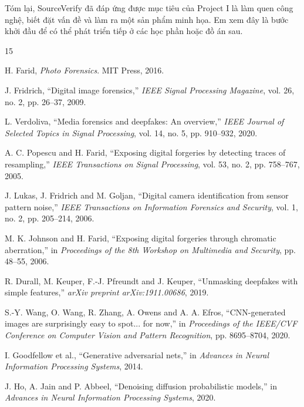\documentclass[14pt,a4paper,oneside]{report}
\begin{document}
Tóm lại, SourceVerify đã đáp ứng được mục tiêu của Project I là làm quen công nghệ, biết đặt vấn đề và làm ra một sản phẩm minh họa. Em xem đây là bước khởi đầu để có thể phát triển tiếp ở các học phần hoặc đồ án sau.

\clearpage

\begin{thebibliography}{15}

 H. Farid, \textit{Photo Forensics}. MIT Press, 2016.

 J. Fridrich, ``Digital image forensics,'' \textit{IEEE Signal Processing Magazine}, vol. 26, no. 2, pp. 26--37, 2009.

 L. Verdoliva, ``Media forensics and deepfakes: An overview,'' \textit{IEEE Journal of Selected Topics in Signal Processing}, vol. 14, no. 5, pp. 910--932, 2020.

 A. C. Popescu and H. Farid, ``Exposing digital forgeries by detecting traces of resampling,'' \textit{IEEE Transactions on Signal Processing}, vol. 53, no. 2, pp. 758--767, 2005.

 J. Lukas, J. Fridrich and M. Goljan, ``Digital camera identification from sensor pattern noise,'' \textit{IEEE Transactions on Information Forensics and Security}, vol. 1, no. 2, pp. 205--214, 2006.

 M. K. Johnson and H. Farid, ``Exposing digital forgeries through chromatic aberration,'' in \textit{Proceedings of the 8th Workshop on Multimedia and Security}, pp. 48--55, 2006.

 R. Durall, M. Keuper, F.-J. Pfreundt and J. Keuper, ``Unmasking deepfakes with simple features,'' \textit{arXiv preprint arXiv:1911.00686}, 2019.

 S.-Y. Wang, O. Wang, R. Zhang, A. Owens and A. A. Efros, ``CNN-generated images are surprisingly easy to spot... for now,'' in \textit{Proceedings of the IEEE/CVF Conference on Computer Vision and Pattern Recognition}, pp. 8695--8704, 2020.

 I. Goodfellow et al., ``Generative adversarial nets,'' in \textit{Advances in Neural Information Processing Systems}, 2014.

 J. Ho, A. Jain and P. Abbeel, ``Denoising diffusion probabilistic models,'' in \textit{Advances in Neural Information Processing Systems}, 2020.


\end{thebibliography}
\end{document}

